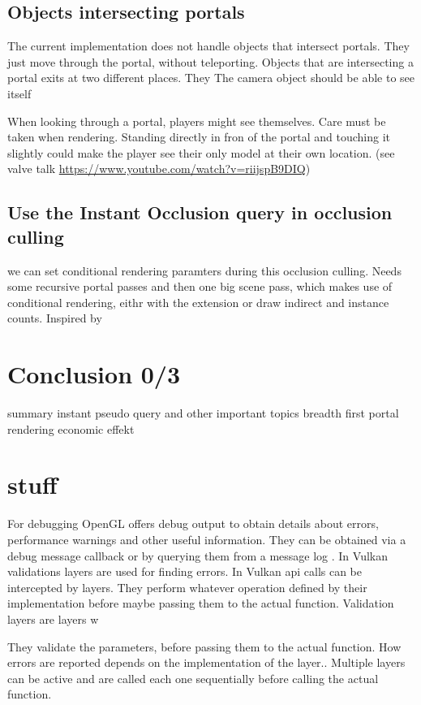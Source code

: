\subsection{Objects intersecting portals}
The current implementation does not handle objects that intersect portals. They just move through the portal, without teleporting. Objects that are intersecting a portal exits at two different places. They
The camera object should be able to see itself


When looking through a portal, players might see themselves. Care must be taken when rendering. Standing directly in fron of the portal and touching it slightly could make the player see their only model at their own location. (see valve talk \url{https://www.youtube.com/watch?v=riijspB9DIQ})

\subsection{Use the Instant Occlusion query in occlusion culling}
we can set conditional rendering paramters during this occlusion culling.
Needs some  recursive portal passes and then one big scene pass, which makes use of conditional rendering, eithr with the extension or draw indirect and instance counts. Inspired by \cite{yang:2014:walkthrough}

\section{Conclusion 0/3}

summary
instant pseudo query and other important topics
breadth first portal rendering
economic effekt

\section*{stuff}
For debugging OpenGL offers debug output to obtain details about errors, performance warnings and other useful information. They can be obtained via a debug message callback or by querying them from a message log \cite{khronos:openGL:spec4.6}. In Vulkan validations layers are used for finding errors. In Vulkan \gls{api} calls can be intercepted by layers. They perform whatever operation defined by their implementation before maybe passing them to the actual function. Validation layers are layers w

They validate the parameters, before passing them to the actual function. How errors are reported depends on the implementation of the layer.. Multiple layers can be active and are called each one sequentially before calling the actual function. \cite{khronos:vulkan:spec1.1}












